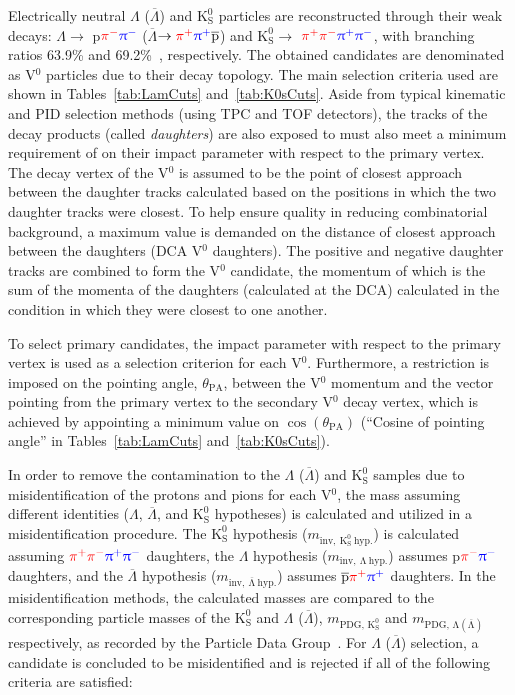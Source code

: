 \documentclass[ALICE,manyauthors]{cernphprep}
\newcommand{\Lam}{$\Lambda$\xspace}
\newcommand{\ALam}{$\overline{\Lambda}$\xspace}
\newcommand{\LamALam}{$\Lambda$ ($\overline{\Lambda}$)\xspace}
\newcommand{\Ks}{$\mathrm{K^{0}_{S}}$\xspace}
\newcommand{\Vz}{V$^{0}$\xspace}
\begin{document}
Electrically neutral \LamALam and \Ks particles are reconstructed through their weak decays: \Lam $\rightarrow$ p${\color{red}\pi^{-}}{\color{blue}\uppi^{-}}$ (\ALam $\rightarrow {\color{red}\pi^{+}}{\color{blue}\uppi^{+}}\overline{\mathrm{p}}$) and \Ks $\rightarrow$ ${\color{red}\pi^{+}\pi^{-}}{\color{blue}\uppi^{+}\uppi^{-}}$, with branching ratios 63.9\% and 69.2\%~\cite{PhysRevD.98.030001}, respectively.
The obtained candidates are denominated as \Vz particles {\color{blue}due to their decay topology}.
The {\color{red}main} selection criteria used are shown in Tables~\ref{tab:LamCuts} and~\ref{tab:K0sCuts}.
Aside from {\color{red}typical} kinematic and PID selection methods (using TPC and TOF detectors), the tracks of the decay products (called \textit{daughters}) {\color{red}are also exposed to} {\color{blue}must also meet} a minimum requirement {\color{red}of} {\color{blue}on} their impact parameter with respect to the primary vertex.  
The decay vertex of the \Vz is {\color{red}assumed to be the point of closest approach between the daughter tracks} {\color{blue}calculated based on the positions in which the two daughter tracks were closest}.
To help {\color{red}ensure quality} {\color{blue}in reducing combinatorial background}, a maximum value is demanded on the distance of closest approach between the daughters (DCA \Vz daughters).
The positive and negative daughter tracks are combined to form the \Vz candidate, the momentum of which is the sum of the momenta of the daughters {\color{red}(calculated at the DCA)} {\color{blue}calculated in the condition in which they were closest to one another}.

To select primary candidates, the impact parameter with respect to the primary vertex is used as a selection criterion for each \Vz.
Furthermore, a restriction is imposed on the pointing angle, $\theta_{\mathrm{PA}}$, between the \Vz momentum and the vector pointing from the primary vertex to the secondary \Vz decay vertex, which is achieved by appointing a minimum value on $\cos(\theta_{\mathrm{PA}})$ (``Cosine of pointing angle'' in Tables~\ref{tab:LamCuts} and~\ref{tab:K0sCuts}).


In order to remove the contamination to the \LamALam and \Ks samples due to misidentification of the protons and pions for each \Vz, the mass assuming different identities (\Lam, \ALam, and \Ks hypotheses) is calculated and utilized in a misidentification procedure.
The \Ks hypothesis ($m_{\mathrm{inv,~ K^{0}_{S}~ hyp.}}$) is calculated assuming ${\color{red}\pi^{+}\pi^{-}} {\color{blue}\uppi^{+}\uppi^{-}}$ daughters, the \Lam hypothesis ($m_{\mathrm{inv,~ \Lambda~ hyp.}}$) assumes p${\color{red}\pi^{-}}{\color{blue}\uppi^{-}}$ daughters, and the \ALam hypothesis ($m_{\mathrm{inv,~ \overline{\Lambda}~ hyp.}}$) assumes $\overline{\mathrm{p}}{\color{red}\pi^{+}}{\color{blue}\uppi^{+}}$ daughters. 
In the misidentification methods, the calculated masses are compared to the corresponding particle masses of the \Ks and \LamALam, $m_{\mathrm{PDG,\,K^{0}_{S}}}$ and $m_{\mathrm{PDG,\,\Lambda(\overline{\Lambda})}}$ respectively, as recorded by the Particle Data Group~\cite{PhysRevD.98.030001}.
For \LamALam selection, a candidate is concluded to be misidentified and is rejected if all of the following criteria are satisfied:
\end{document}
